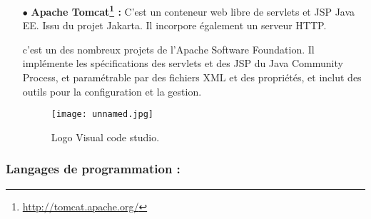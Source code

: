 \begin{itemize}
        \medskip
    
   \item[$\bullet$] \textbf{Apache Tomcat\footnote{\url{http://tomcat.apache.org/}} :} C'est un conteneur web libre de servlets et JSP Java EE. Issu du projet Jakarta. Il incorpore également un serveur HTTP\cite{wiki:tomcat}.
    
 c’est un des nombreux projets de l’Apache Software Foundation. Il implémente les spécifications des servlets et des JSP du Java Community Process, et paramétrable par des fichiers XML et des propriétés, et inclut des outils pour la configuration et la gestion.
 
  \begin{figure}[ht]
 	\centering
 	\texttt{[image: unnamed.jpg]}
 	\caption{Logo Visual code studio.}
 	\label{fig:logo Apache Tomcat}
 \end{figure}
 \FloatBarrier
\medskip
\end{itemize}


\subsubsection{Langages de programmation :}

